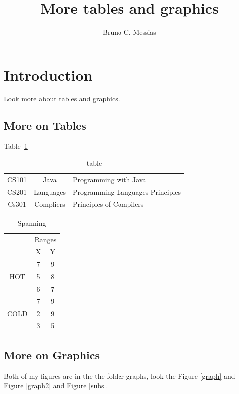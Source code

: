\documentclass{proc}
\title{More tables and graphics}
\author{Bruno C. Messias}
\date{}
\begin{document}
\maketitle

\section{Introduction}

Look more about tables and graphics.

\subsection{More on Tables}


Table~\ref{tab}

\begin{table}[htbp]
    \caption{table}
    \centering
    \begin{tabular}{|c|c|p{3cm}|}
        \hline
        CS101 & Java & Programming with Java \\
        CS201 & Languages & Programming Languages Principles \\
        Cs301 & Compliers & Principles of Compilers \\
        \hline
    \end{tabular}
    \label{tab}
\end{table}

\begin{table}[htbp]
	\centering
	\caption{Spanning}
	\begin{tabular}{|c|c|c|}
		\hline
        & \multicolumn{2}{c|}{Ranges} \\
        & X & Y \\
        \hline
        \multirow{3}{*}{HOT} & 7 & 9 \\
        & 5 & 8 \\
        & 6 & 7 \\
        \hline
        \multirow{3}{*}{COLD} & 7 & 9 \\
        & 2 & 9 \\
        & 3 & 5 \\
        \hline
	\end{tabular}
\end{table}

\subsection{More on Graphics}

Both of my figures are in the the folder graphs, look the Figure \ref{graph} and Figure \ref{graph2} and Figure \ref{subs}.
\end{document}
